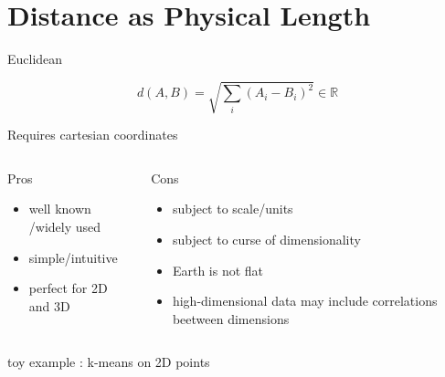 \documentclass{beamer}
\begin{document}
\section{Distance as Physical Length}


\begin{frame}{Euclidean}

$$d(A,B)= \sqrt{\sum_{i}(A_i-B_i)^2} \in \mathbb{R}$$

Requires \alert{cartesian coordinates} 



\begin{columns}[T,onlytextwidth]
\begin{block}{Pros}
\begin{itemize}
  \item well known /widely used
  \item simple/intuitive
  \item perfect for 2D and 3D 
\end{itemize}
\end{block}
\begin{block}{Cons}
\begin{spacing}{0.9}
\begin{itemize}
  \item subject to scale/units 
  \item subject to curse of dimensionality 
  \item Earth is not flat
  \item high-dimensional data may include correlations beetween dimensions
\end{itemize}
\end{spacing}
\end{block}
\end{columns}


toy example : k-means on 2D points 


\end{frame}
\end{document}
